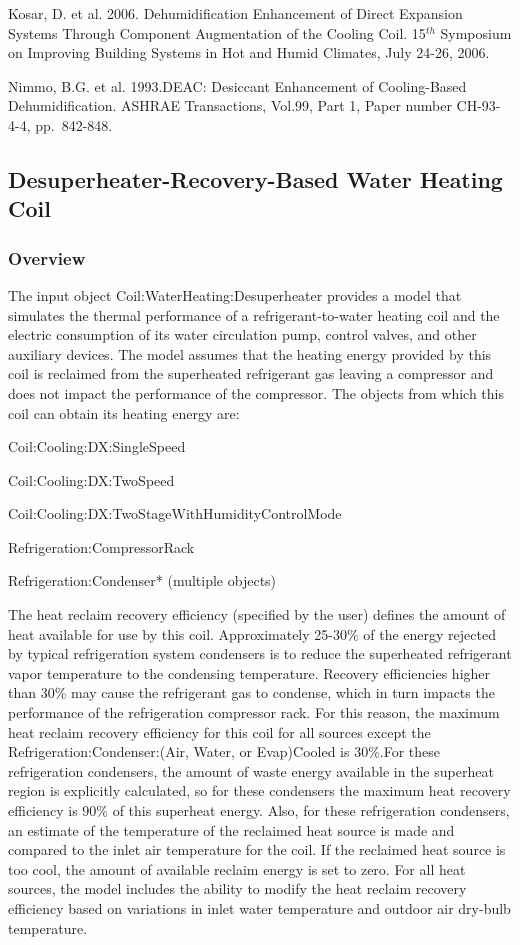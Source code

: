 Kosar, D. et al. 2006. Dehumidification Enhancement of Direct Expansion Systems Through Component Augmentation of the Cooling Coil. 15\(^{th}\) Symposium on Improving Building Systems in Hot and Humid Climates, July 24-26, 2006.

Nimmo, B.G. et al. 1993.DEAC: Desiccant Enhancement of Cooling-Based Dehumidification. ASHRAE Transactions, Vol.99, Part 1, Paper number CH-93-4-4, pp.~842-848.

\subsection{Desuperheater-Recovery-Based Water Heating Coil}\label{desuperheater-recovery-based-water-heating-coil}

\subsubsection{Overview}\label{overview-10}

The input object Coil:WaterHeating:Desuperheater provides a model that simulates the thermal performance of a refrigerant-to-water heating coil and the electric consumption of its water circulation pump, control valves, and other auxiliary devices. The model assumes that the heating energy provided by this coil is reclaimed from the superheated refrigerant gas leaving a compressor and does not impact the performance of the compressor. The objects from which this coil can obtain its heating energy are:

Coil:Cooling:DX:SingleSpeed

Coil:Cooling:DX:TwoSpeed

Coil:Cooling:DX:TwoStageWithHumidityControlMode

Refrigeration:CompressorRack

Refrigeration:Condenser* (multiple objects)

The heat reclaim recovery efficiency (specified by the user) defines the amount of heat available for use by this coil. Approximately 25-30\% of the energy rejected by typical refrigeration system condensers is to reduce the superheated refrigerant vapor temperature to the condensing temperature. Recovery efficiencies higher than 30\% may cause the refrigerant gas to condense, which in turn impacts the performance of the refrigeration compressor rack. For this reason, the maximum heat reclaim recovery efficiency for this coil for all sources except the Refrigeration:Condenser:(Air, Water, or Evap)Cooled is 30\%.For these refrigeration condensers, the amount of waste energy available in the superheat region is explicitly calculated, so for these condensers the maximum heat recovery efficiency is 90\% of this superheat energy. Also, for these refrigeration condensers, an estimate of the temperature of the reclaimed heat source is made and compared to the inlet air temperature for the coil. If the reclaimed heat source is too cool, the amount of available reclaim energy is set to zero. For all heat sources, the model includes the ability to modify the heat reclaim recovery efficiency based on variations in inlet water temperature and outdoor air dry-bulb temperature.

